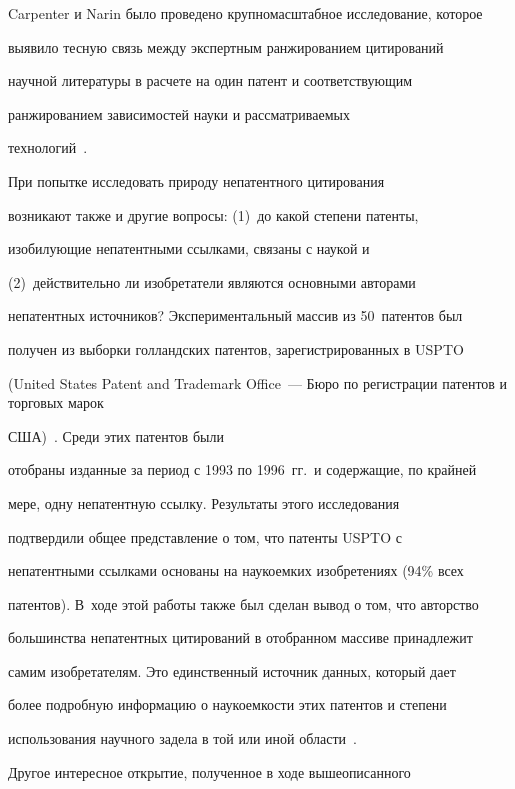 Carpenter и Narin было проведено крупномасштабное исследование, которое 


выявило тесную связь между экспертным ранжированием цитирований 


научной литературы в расчете на один патент и соответствующим 


ранжированием зависимостей науки и рассматриваемых 


     технологий~\cite{9-koz}.


     


     При попытке исследовать природу непатентного цитирования 


возникают также и другие вопросы: (1)~до какой степени патенты, 


изобилующие непатентными ссылками, связаны с наукой и 


(2)~действительно ли изобретатели являются основными авторами 


непатентных источников? Экспериментальный массив из 50~патентов был 


получен из выборки голландских патентов, зарегистрированных в USPTO 


(United States Patent and Trademark Office~--- Бюро по регистрации патентов и торговых марок 


США)~\cite{1-koz}. Среди этих патентов были 


отобраны изданные за период с 1993 по 1996~гг.\ и содержащие, по крайней 


мере, одну непатентную ссылку. Результаты этого исследования 


подтвердили общее представление о том, что патенты USPTO с 


непатентными ссылками основаны на наукоемких изобретениях (94\% всех 


патентов). В~ходе этой работы также был сделан вывод о том, что авторство 


большинства непатентных цитирований в отобранном массиве принадлежит 


самим изобретателям. Это единственный источник данных, который дает 


более подробную информацию о наукоемкости этих патентов и степени 


использования научного задела в той или иной области~\cite{1-koz, 9-koz}.


     


     Другое интересное открытие, полученное в ходе вышеописанного 


